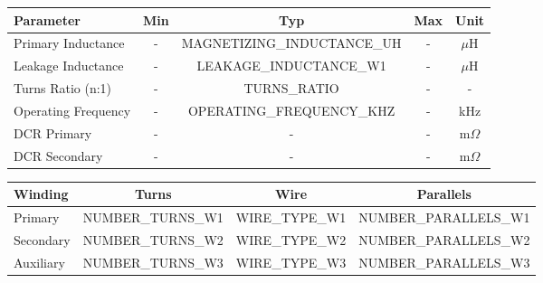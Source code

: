 \documentclass[10pt,a4paper]{article}
\begin{document}
\begin{minipage}[t]{0.48\textwidth}

\noindent{\large\bfseries\textcolor{headerblue}{Electrical Characteristics}}
\vspace{2mm}

\footnotesize
\begin{tabular}{|l|c|c|c|c|}
\hline
\rowcolor{lightgray}
\textbf{Parameter} & \textbf{Min} & \textbf{Typ} & \textbf{Max} & \textbf{Unit} \\
\hline
Primary Inductance & - & {{MAGNETIZING_INDUCTANCE_UH}} & - & $\mu$H \\
\hline
Leakage Inductance & - & {{LEAKAGE_INDUCTANCE_W1}} & - & $\mu$H \\
\hline
Turns Ratio (n:1) & - & {{TURNS_RATIO}} & - & - \\
\hline
Operating Frequency & - & {{OPERATING_FREQUENCY_KHZ}} & - & kHz \\
\hline
DCR Primary & - & - & - & m$\Omega$ \\
\hline
DCR Secondary & - & - & - & m$\Omega$ \\
\hline
\end{tabular}

\vspace{5mm}

\noindent{\large\bfseries\textcolor{headerblue}{Winding Configuration}}
\vspace{2mm}

\footnotesize
\begin{tabular}{|l|c|c|c|}
\hline
\rowcolor{lightgray}
\textbf{Winding} & \textbf{Turns} & \textbf{Wire} & \textbf{Parallels} \\
\hline
Primary & {{NUMBER_TURNS_W1}} & {{WIRE_TYPE_W1}} & {{NUMBER_PARALLELS_W1}} \\
\hline
Secondary & {{NUMBER_TURNS_W2}} & {{WIRE_TYPE_W2}} & {{NUMBER_PARALLELS_W2}} \\
\hline
Auxiliary & {{NUMBER_TURNS_W3}} & {{WIRE_TYPE_W3}} & {{NUMBER_PARALLELS_W3}} \\
\hline
\end{tabular}

\vspace{5mm}

\noindent{\large\bfseries\textcolor{headerblue}{Isolation \& Safety}}
\vspace{2mm}


\end{minipage}
\end{document}
